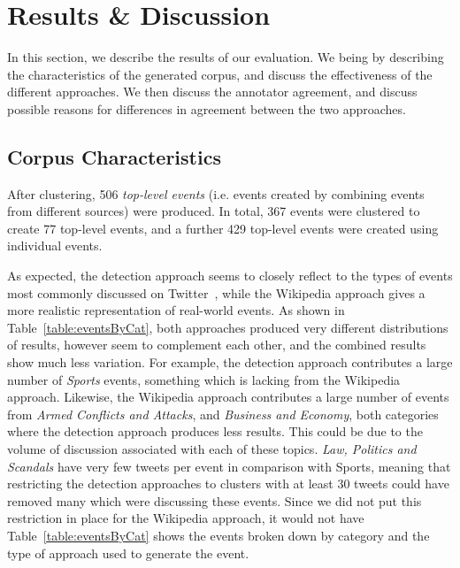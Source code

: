 \section{Results \& Discussion}
\label{collection:sec:results}
In this section, we describe the results of our evaluation.
We being by describing the characteristics of the generated corpus, and discuss the effectiveness of the different approaches.
We then discuss the annotator agreement, and discuss possible reasons for differences in agreement between the two approaches.

\subsection{Corpus Characteristics}
After clustering, 506 \emph{top-level events} (i.e. events created by combining events from different sources) were produced.
In total, 367 events were clustered to create 77 top-level events, and a further 429 top-level events were created using individual events.

As expected, the detection approach seems to closely reflect to the types of events most commonly discussed on Twitter~\cite{zhao2011empirical}, while the Wikipedia approach gives a more realistic representation of real-world events.
As shown in Table~\ref{table:eventsByCat}, both approaches produced very different distributions of results, however seem to complement each other, and the combined results show much less variation.
For example, the detection approach contributes a large number of \emph{Sports} events, something which is lacking from the Wikipedia approach.
Likewise, the Wikipedia approach contributes a large number of events from \emph{Armed Conflicts and Attacks}, and \emph{Business and Economy}, both categories where the detection approach produces less results.
This could be due to the volume of discussion associated with each of these topics.
\emph{Law, Politics and Scandals} have very few tweets per event in comparison with Sports, meaning that restricting the detection approaches to clusters with at least 30 tweets could have removed many which were discussing these events.
Since we did not put this restriction in place for the Wikipedia approach, it would not have
Table~\ref{table:eventsByCat} shows the events broken down by category and the type of approach used to generate the event.


